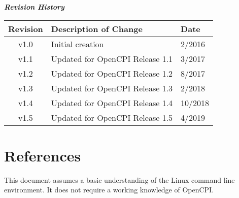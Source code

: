         \begin{center}
        \textit{\textbf{Revision History}}
                \begin{table}[H]
                \label{table:revisions} %
                        \begin{tabularx}{\textwidth}{|c|X|l|}
                        \hline
                        \rowcolor{blue}
                        \textbf{Revision} & \textbf{Description of Change} & \textbf{Date} \\
                        \hline
                        v1.0 & Initial creation & 2/2016 \\
                        \hline
                        v1.1 & Updated for OpenCPI Release 1.1 & 3/2017 \\
                        \hline
                        v1.2 & Updated for OpenCPI Release 1.2 & 8/2017 \\
                        \hline
                        v1.3 & Updated for OpenCPI Release 1.3 & 2/2018 \\
                        \hline
                        v1.4 & Updated for OpenCPI Release 1.4 & 10/2018 \\
                        \hline
                        v1.5 & Updated for OpenCPI Release 1.5 & 4/2019 \\
                        \hline
                        \end{tabularx}
                \end{table}
        \end{center}

\newpage
\tableofcontents
\newpage
\listoffigures
\newpage
\listoftables
\newpage
{}
\section{References}

This document assumes a basic understanding of the Linux command line environment. It does not require a working knowledge of OpenCPI.
\def\refskipgs{} %
\def\myreferences{
\hline
Component Development Guide &
\githubio{OpenCPI\_Component\_Development.pdf} \\
\hline
RCC Development Guide &
\githubio{OpenCPI\_RCC\_Development.pdf} \\
\hline
HDL Development Guide &
\githubio{OpenCPI\_HDL\_Development.pdf} \\
}


